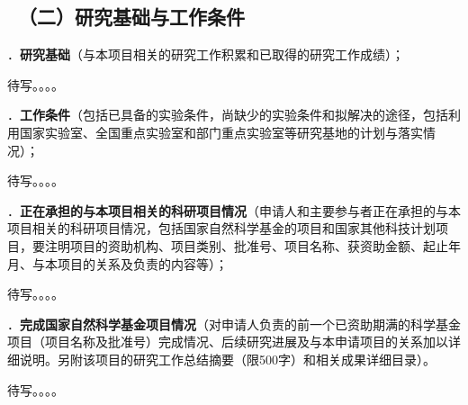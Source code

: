 {\color{MsBlue} \subsection{\texorpdfstring{\sihao \kaishu \quad \ （二）研究基础与工作条件 }{（二）研究基础与工作条件 }}}


{\sihao \color{MsBlue} ．{\bfseries 研究基础}（与本项目相关的研究工作积累和已取得的研究工作成绩）；}

待写。。。。

\vskip 5mm



{\sihao \color{MsBlue} ．{\bfseries 工作条件}（包括已具备的实验条件，尚缺少的实验条件和拟解决的途径，包括利用国家实验室、全国重点实验室和部门重点实验室等研究基地的计划与落实情况）；}

待写。。。。

\vskip 5mm



{\sihao \color{MsBlue} ．{\bfseries 正在承担的与本项目相关的科研项目情况}（申请人和主要参与者正在承担的与本项目相关的科研项目情况，包括国家自然科学基金的项目和国家其他科技计划项目，要注明项目的资助机构、项目类别、批准号、项目名称、\hspace{0.1em}获资助金额、\hspace{0.1em}起止年月、\hspace{0.1em}与本项目的关系及负责的内容等）；}

待写。。。。

\vskip 5mm



{\sihao \color{MsBlue} ．{\bfseries 完成国家自然科学基金项目情况}（对申请人负责的前一个已资助期满的科学基金项目\hspace{0.1em}（项目名称及批准号）\hspace{0.1em}完成情况、后续研究进展及与本申请项目的关系加以详细说明。另附该项目的研究工作总结摘要（限500字）和相关成果详细目录）。}

待写。。。。

\vskip 5mm
